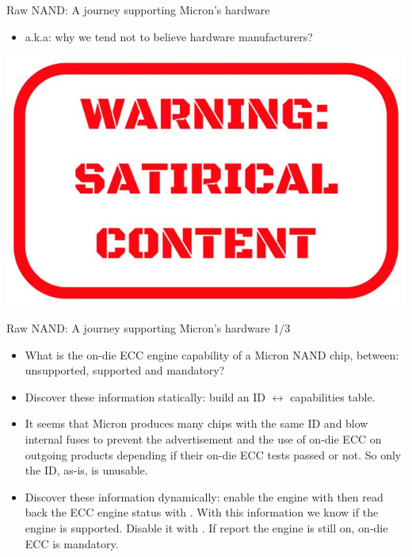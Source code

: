 \documentclass[aspectratio=169,obeyspaces,spaces,hyphens,dvipsnames]{beamer}
\begin{document}
\begin{frame}{Raw NAND: A journey supporting Micron's hardware}
  \begin{itemize}
  \item a.k.a: why we tend not to believe hardware manufacturers?
  \end{itemize}
  \vfill
  \begin{center}
    \includegraphics[scale=0.2]{satirical-content.jpg}
  \end{center}
\end{frame}

\begin{frame}{Raw NAND: A journey supporting Micron's hardware 1/3}
  \begin{itemize}
  \item [Plot] What is the on-die ECC engine capability of a Micron
    NAND chip, between: unsupported, supported and mandatory?
  \item [Solution] Discover these information statically: build an
    ID $\leftrightarrow$ capabilities table.
  \item [Issue 1] It seems that Micron produces many chips with the
    same ID and blow internal fuses to prevent the advertisement and the
    use of on-die ECC on outgoing products depending if their on-die ECC
    tests passed or not. So only the ID, as-is, is unusable.
  \item [Fix 1] Discover these information dynamically: enable the
    engine with  then read back the ECC engine
    status with . With this information we know
    if the engine is supported. Disable it with
    . If  report the
    engine is still on, on-die ECC is mandatory.
  \end{itemize}
\end{frame}
\end{document}
